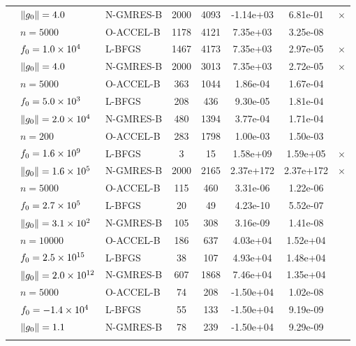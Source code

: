 \begin{tabular}{*{3}{l}*{2}{S[table-format=4]}
*{2}{S[table-format=-1.1e-2]}c}
 & ${\|g_0\|} = \num{4.0e+00} $  & N-GMRES-B & 2000 & 4093 & -1.14e+03 & 6.81e-01 & $\times$ \\
\addlinespace
{} & $ n = \num{5000} $  & O-ACCEL-B & 1178 & 4121 & 7.35e+03 & 3.25e-08 &  \\
 & $f_0 = \num{1.0e+04} $  & L-BFGS & 1467 & 4173 & 7.35e+03 & 2.97e-05 & $\times$ \\
 & ${\|g_0\|} = \num{4.0e+00} $  & N-GMRES-B & 2000 & 3013 & 7.35e+03 & 2.72e-05 & $\times$ \\
\addlinespace
{} & $ n = \num{5000} $  & O-ACCEL-B & 363 & 1044 & 1.86e-04 & 1.67e-04 &  \\
 & $f_0 = \num{5.0e+03} $  & L-BFGS & 208 & 436 & 9.30e-05 & 1.81e-04 &  \\
 & ${\|g_0\|} = \num{2.0e+04} $  & N-GMRES-B & 480 & 1394 & 3.77e-04 & 1.71e-04 &  \\
\addlinespace
{} & $ n = \num{200} $  & O-ACCEL-B & 283 & 1798 & 1.00e-03 & 1.50e-03 &  \\
 & $f_0 = \num{1.6e+09} $  & L-BFGS & 3 & 15 & 1.58e+09 & 1.59e+05 & $\times$ \\
 & ${\|g_0\|} = \num{1.6e+05} $  & N-GMRES-B & 2000 & 2165 & 2.37e+172 & 2.37e+172 & $\times$ \\
\addlinespace
{} & $ n = \num{5000} $  & O-ACCEL-B & 115 & 460 & 3.31e-06 & 1.22e-06 &  \\
 & $f_0 = \num{2.7e+05} $  & L-BFGS & 20 & 49 & 4.23e-10 & 5.52e-07 &  \\
 & ${\|g_0\|} = \num{3.1e+02} $  & N-GMRES-B & 105 & 308 & 3.16e-09 & 1.41e-08 &  \\
\addlinespace
{} & $ n = \num{10000} $  & O-ACCEL-B & 186 & 637 & 4.03e+04 & 1.52e+04 &  \\
 & $f_0 = \num{2.5e+15} $  & L-BFGS & 38 & 107 & 4.93e+04 & 1.48e+04 &  \\
 & ${\|g_0\|} = \num{2.0e+12} $  & N-GMRES-B & 607 & 1868 & 7.46e+04 & 1.35e+04 &  \\
\addlinespace
{} & $ n = \num{5000} $  & O-ACCEL-B & 74 & 208 & -1.50e+04 & 1.02e-08 &  \\
 & $f_0 = \num{-1.4e+04} $  & L-BFGS & 55 & 133 & -1.50e+04 & 9.19e-09 &  \\
 & ${\|g_0\|} = \num{1.1e+00} $  & N-GMRES-B & 78 & 239 & -1.50e+04 & 9.29e-09 &  \\
\addlinespace

\end{tabular}
